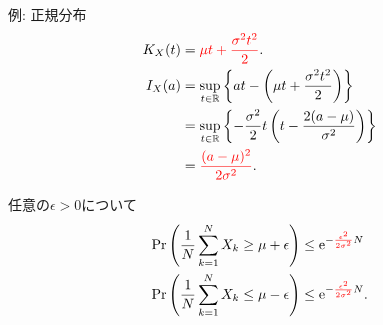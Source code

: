 \documentclass[lualatex,handout]{beamer}
\newcommand{\mycolor}[2]{%
  \begingroup
  \colorlet{currentcolor}{.}%
  \color{#1}#2%
  \color{currentcolor}%
  \endgroup
}
\newcommand{\emm}[1]{\mycolor{red}{#1}}
\theoremstyle{definition}
\begin{document}
\begin{frame}{例: 正規分布}
\begin{align*}
K_X(t) &= \emm{\mu t + \frac{\sigma^2t^2}2}.\\
I_X(a)&=\sup_{t\in\mathbb{R}} \left\{at - \left(\mu t + \frac{\sigma^2t^2}2\right)\right\}\\
&= \sup_{t\in\mathbb{R}} \left\{-\frac{\sigma^2}2 t\left(t-\frac{2(a-\mu)}{\sigma^2}\right) \right\}\\
&=\emm{\frac{(a-\mu)^2}{2\sigma^2}}.
\end{align*}

\vspace{1em}
任意の$\epsilon>0$について
\begin{align*}
\Pr\left(\frac1N\sum_{k=1}^N X_k \ge \mu + \epsilon\right) &\le \mathrm{e}^{-\emm{\frac{\epsilon^2}{2\sigma^2}}N}\\
\Pr\left(\frac1N\sum_{k=1}^N X_k \le \mu - \epsilon\right) &\le \mathrm{e}^{-\emm{\frac{\epsilon^2}{2\sigma^2}}N}.
\end{align*}
\end{frame}
\end{document}
